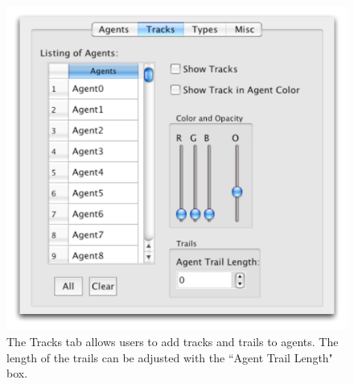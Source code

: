 \documentclass[conference]{IEEEtran}
\begin{document}
\begin{figure}
\centering
\includegraphics[scale=.5]{images/trackstab.pdf}
\caption{
The Tracks tab allows users to add tracks and trails to agents. The length of the trails can be adjusted 
with the ``Agent Trail Length" box. }
\label{TracksTab}
\end{figure}
\end{document}
